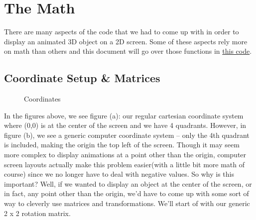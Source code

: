 \documentclass[14pt]{article}
\begin{document}
\newpage

\section*{The Math}

There are many aspects of the code that we had to come up with in order to display an animated 3D object on a 2D screen. Some of these aspects rely more on math than others and this document will go over those functions in \textcolor{blue}{\href{https://github.com/itsmehere/SpinningCube/blob/main/cubeProj.py}{this code}}.

\subsection*{Coordinate Setup \& Matrices}

\begin{figure}[!htb]
    \centering
    \qquad
    \caption{Coordinates}%
    \label{fig:example}%
\end{figure}

In the figures above, we see figure (a): our regular cartesian coordinate system where (0,0) is at the center of the screen and we have 4 quadrants. However, in figure (b), we see a generic computer coordinate system -- only the 4th quadrant is included, making the origin the top left of the screen. Though it may seem more complex to display animations at a point other than the origin, computer screen layouts actually make this problem easier(with a little bit more math of course) since we no longer have to deal with negative values. So why is this important? Well, if we wanted to display an object at the center of the screen, or in fact, any point other than the origin, we'd have to come up with some sort of way to cleverly use matrices and transformations. We'll start of with our generic 2 x 2 rotation matrix.
\end{document}
